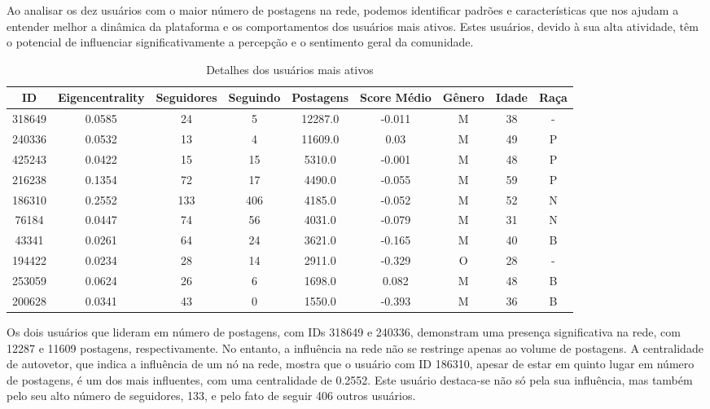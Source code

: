 Ao analisar os dez usuários com o maior número de postagens na rede, podemos identificar padrões e características que nos ajudam a entender melhor a dinâmica da plataforma e os comportamentos dos usuários mais ativos. Estes usuários, devido à sua alta atividade, têm o potencial de influenciar significativamente a percepção e o sentimento geral da comunidade.

\begin{table}[h]
	\centering
	\caption{Detalhes dos usuários mais ativos}
	\begin{tabular}{|c|c|c|c|c|c|c|c|c|}
		\hline
		ID     & Eigencentrality & Seguidores & Seguindo & Postagens & Score Médio & Gênero & Idade & Raça \\
		\hline
		318649 & 0.0585          & 24         & 5        & 12287.0   & -0.011      & M      & 38    & -    \\
		\hline
		240336 & 0.0532          & 13         & 4        & 11609.0   & 0.03        & M      & 49    & P    \\
		\hline
		425243 & 0.0422          & 15         & 15       & 5310.0    & -0.001      & M      & 48    & P    \\
		\hline
		216238 & 0.1354          & 72         & 17       & 4490.0    & -0.055      & M      & 59    & P    \\
		\hline
		186310 & 0.2552          & 133        & 406      & 4185.0    & -0.052      & M      & 52    & N    \\
		\hline
		76184  & 0.0447          & 74         & 56       & 4031.0    & -0.079      & M      & 31    & N    \\
		\hline
		43341  & 0.0261          & 64         & 24       & 3621.0    & -0.165      & M      & 40    & B    \\
		\hline
		194422 & 0.0234          & 28         & 14       & 2911.0    & -0.329      & O      & 28    & -    \\
		\hline
		253059 & 0.0624          & 26         & 6        & 1698.0    & 0.082       & M      & 48    & B    \\
		\hline
		200628 & 0.0341          & 43         & 0        & 1550.0    & -0.393      & M      & 36    & B    \\
		\hline
	\end{tabular}
\end{table}

Os dois usuários que lideram em número de postagens, com IDs 318649 e 240336, demonstram uma presença significativa na rede, com 12287 e 11609 postagens, respectivamente. No entanto, a influência na rede não se restringe apenas ao volume de postagens. A centralidade de autovetor, que indica a influência de um nó na rede, mostra que o usuário com ID 186310, apesar de estar em quinto lugar em número de postagens, é um dos mais influentes, com uma centralidade de 0.2552. Este usuário destaca-se não só pela sua influência, mas também pelo seu alto número de seguidores, 133, e pelo fato de seguir 406 outros usuários.

